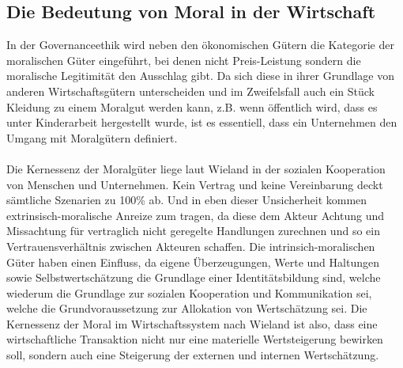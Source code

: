 \documentclass[12pt]{article}
\begin{document}
\subsection{Die Bedeutung von Moral in der Wirtschaft}
In der Governanceethik wird neben den ökonomischen Gütern die Kategorie der moralischen Güter eingeführt, bei denen nicht Preis-Leistung sondern die moralische Legitimität den Ausschlag gibt. Da sich diese in ihrer Grundlage von anderen Wirtschaftsgütern unterscheiden und im Zweifelsfall auch ein Stück Kleidung zu einem Moralgut werden kann, z.B. wenn öffentlich wird, dass es unter Kinderarbeit hergestellt wurde, ist es essentiell, dass ein Unternehmen den Umgang mit Moralgütern definiert.\\
\\
Die Kernessenz der Moralgüter liege laut Wieland in der sozialen Kooperation von Menschen und Unternehmen. Kein Vertrag und keine Vereinbarung deckt sämtliche Szenarien zu 100\% ab. Und in eben dieser Unsicherheit kommen extrinsisch-moralische Anreize zum tragen, da diese dem Akteur Achtung und Missachtung für vertraglich nicht geregelte Handlungen zurechnen und so ein Vertrauensverhältnis zwischen Akteuren schaffen. Die intrinsich-moralischen Güter haben einen Einfluss, da eigene Überzeugungen, Werte und Haltungen sowie Selbstwertschätzung die Grundlage einer Identitätsbildung sind, welche wiederum die Grundlage zur sozialen Kooperation und Kommunikation sei, welche die Grundvoraussetzung zur Allokation von Wertschätzung sei. Die Kernessenz der Moral im Wirtschaftssystem nach Wieland ist also, dass eine wirtschaftliche Transaktion nicht nur eine materielle Wertsteigerung bewirken soll, sondern auch eine Steigerung der externen und internen Wertschätzung.
\end{document}
